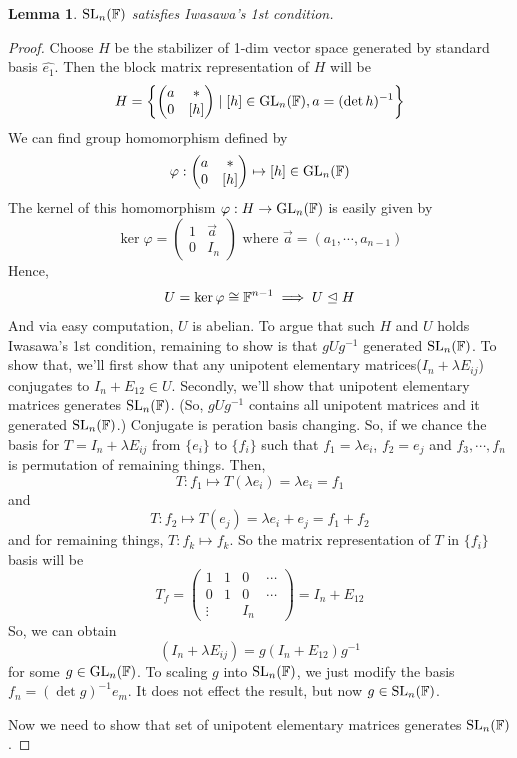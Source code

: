 \documentclass[12pt, letterpaper]{amsart}
\newtheorem{lem}[thm]{Lemma}
\theoremstyle{definition}
\theoremstyle{remark}
\theoremstyle{plain}
\newcommand{\normal}{\trianglelefteq}
\numberwithin{equation}{section}
\begin{document}
\begin{lem}
    ${\mathrm{SL}}_n({\mathbb {F}})$ satisfies Iwasawa's 1st condition. 
\end{lem}

\begin{proof}
    Choose $H$ be the stabilizer of 1-dim vector space generated by standard basis $\hat{e_1}$. 
    Then the block matrix representation of $H$ will be 
    \[H = \left\{\begin{pmatrix}
    a & * \\
    0 & [h]
    \end{pmatrix} \mid [h] \in {\mathrm{GL}}_n({\mathbb {F}}), a = (\det h)^{-1}\right\}\]
    We can find group homomorphism defined by 
    \[\varphi: \begin{pmatrix}
        a & * \\ 
        0 & [h]
    \end{pmatrix} \mapsto [h] \in {\mathrm{GL}}_n({\mathbb {F}})\]
    The kernel of this homomorphism $\varphi: H \rightarrow {\mathrm{GL}}_n({\mathbb {F}})$ is easily given by 
    \[\ker \varphi = \begin{pmatrix}
        1 & \vec{a} \\ 
        0 & I_n
    \end{pmatrix} 
    \text{ where $\vec{a} = (a_1, \cdots, a_{n-1})$}\]
    Hence, 
    \[U = \ker \varphi \cong \BF^{n-1} \implies U \normal H\]
    And via easy computation, $U$ is abelian. To argue that such $H$ and $U$ holds Iwasawa's 1st condition, 
    remaining to show is that $gUg^{-1}$ generated ${\mathrm{SL}}_n({\mathbb {F}})$. 
    To show that, we'll first show that any unipotent elementary matrices($I_n + \lambda E_{ij}$) conjugates to 
    $I_n + E_{12} \in U$. Secondly, we'll show that unipotent elementary matrices generates ${\mathrm{SL}}_n({\mathbb {F}})$. (So, $gUg^{-1}$ contains all unipotent matrices and it generated ${\mathrm{SL}}_n({\mathbb {F}})$.)
    Conjugate is peration basis changing. So, if we chance the basis for $T = I_n + \lambda E_{ij}$ 
    from $\{e_i\}$ to $\{f_i\}$ such that $f_1 = \lambda e_i$, $f_2 = e_j$ and $f_3, \cdots, f_n$ is permutation of remaining things. 
    Then, 
    \[T: f_1 \mapsto T(\lambda e_i) = \lambda e_i = f_1\]
    and 
    \[T: f_2 \mapsto T(e_j) = \lambda e_i + e_j = f_1 + f_2\]
    and for remaining things, $T: f_k \mapsto f_k$. 
    So the matrix representation of $T$ in $\{f_i\}$ basis will be 
    \[T_{f} = \begin{pmatrix}
        1 & 1 & 0 & \cdots \\ 
        0 & 1 & 0 & \cdots \\
        \vdots & & I_n  
    \end{pmatrix} = I_n + E_{12}\]
    So, we can obtain 
    \[(I_n + \lambda E_{ij}) = g(I_n + E_{12}) g^{-1}\]
    for some $g \in {\mathrm{GL}}_n({\mathbb {F}})$. To scaling $g$ into ${\mathrm{SL}}_n({\mathbb {F}})$, 
    we just modify the basis $f_n = (\det g)^{-1} e_m$. 
    It does not effect the result, but now $g \in {\mathrm{SL}}_n({\mathbb {F}})$.  
    
    Now we need to show that set of unipotent elementary matrices generates ${\mathrm{SL}}_n({\mathbb {F}})$. 
    
\end{proof}
\end{document}
